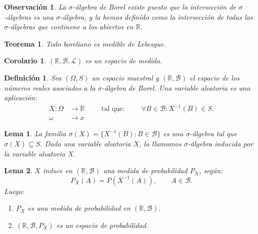 \documentclass{report}
\newtheorem{thm}{Teorema}[section]
\newtheorem{lem}{Lema}[section]
\newtheorem{cor}{Corolario}[thm]
\newtheorem{dfn}{Definición}[section]
\newtheorem{obs}{Observación}[section]
\begin{document}
\begin{obs}
    La $\sigma$-álgebra de Borel existe puesto que la intersección de $\sigma$-álgebras es una $\sigma$-álgebra, y la hemos definido como la intersección
    de todas las $\sigma$-álgebras que continene a los abiertos en $\mathbb{R}$.
\end{obs}

\begin{thm}
    Todo boreliano es medible de Lebesgue.
\end{thm}

\begin{cor}
    $(\mathbb{R}, \mathcal{B}, \mathscr{L})$ es un espacio de medida.
\end{cor}

\begin{dfn}
    Sea $(\Omega, S)$ un espacio muestral y $(\mathbb{R}, \mathcal{B})$ el espacio de los números reales asociados a la $\sigma$-álgebra de Borel. Una
    variable aleatoria es una aplicación:
    \begin{equation*}
        \begin{split}
        X: \Omega & \rightarrow \mathbb{R} \qquad \text{ tal que: }  \qquad \forall B \in \mathcal{B}: X^{-1}(B) \in S.\\
            \omega & \rightarrow x
\end{split}
    \end{equation*}

\end{dfn}

\begin{lem}
    La familia $\sigma(X)=\{X^{-1}(B): B\in\mathcal{B}\}$ es una $\sigma$-álgebra tal que $\sigma(X)\subseteq S$. Dada
    una variable aleatoria $X$, la llamamos $\sigma$-álgebra \emph{inducida} por la variable aleatoria X.
\end{lem}

\begin{lem} $X$ induce en $(\mathbb{R}, \mathcal{B})$ una medida de probabilidad $P_X$, según:
    $$
    P_X(A) = P(X^{-1}(A)), \qquad A\in\mathcal{B}.
    $$
    Luego:
    \begin{enumerate}
        \item $P_X$ es una medida de probabilidad en $(\mathbb{R}, \mathcal{B})$.
        \item $(\mathbb{R}, \mathcal{B}, P_X)$ es un espacio de probabilidad.
    \end{enumerate}
\end{lem}
\end{document}
